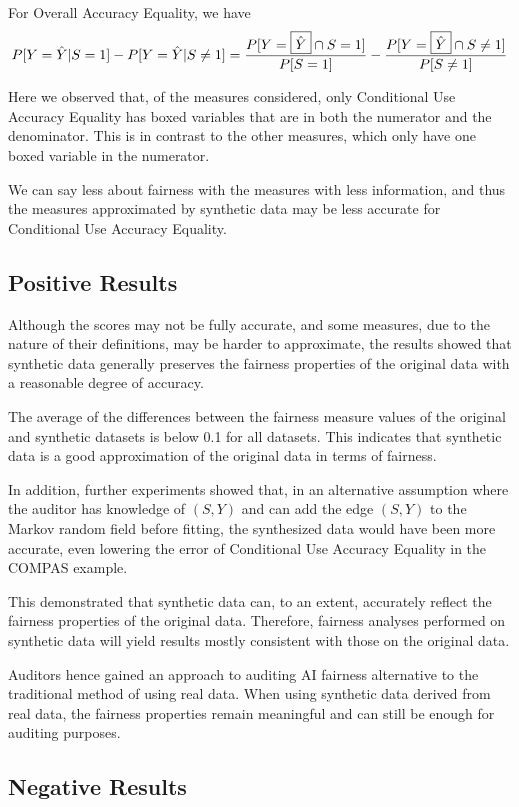 \documentclass[manuscript,screen,review,anonymous]{acmart}
\begin{document}
For Overall Accuracy Equality, we have
\[
P[Y = \hat{Y} | {S} = 1 ] - P[Y = \hat{Y} | {S} \neq 1]
= \frac{P[{Y} = \boxed{\hat{Y}} \cap {S} = 1]}{P[{S} = 1]} - \frac{P[{Y} = \boxed{\hat{Y}} \cap {{S}} \neq 1]}{P[{{S}} \neq 1]}
\]

Here we observed that, of the measures considered, only Conditional Use Accuracy Equality has boxed variables that are in both the numerator and the denominator. This is in contrast to the other measures, which only have one boxed variable in the numerator.

We can say less about fairness with the measures with less information, and thus the measures approximated by synthetic data may be less accurate for Conditional Use Accuracy Equality.

\subsection{Positive Results}

Although the scores may not be fully accurate, and some measures, due to the nature of their definitions, may be harder to approximate, the results showed that synthetic data generally preserves the fairness properties of the original data with a reasonable degree of accuracy.

The average of the differences between the fairness measure values of the original and synthetic datasets is below 0.1 for all datasets. This indicates that synthetic data is a good approximation of the original data in terms of fairness.

In addition, further experiments showed that, in an alternative assumption where the auditor has knowledge of $(S,Y)$ and can add the edge $(S,Y)$ to the Markov random field before fitting, the synthesized data would have been more accurate, even lowering the error of Conditional Use Accuracy Equality in the COMPAS example.

This demonstrated that synthetic data can, to an extent, accurately reflect the fairness properties of the original data. Therefore, fairness analyses performed on synthetic data will yield results mostly consistent with those on the original data.

Auditors hence gained an approach to auditing AI fairness alternative to the traditional method of using real data. When using synthetic data derived from real data, the fairness properties remain meaningful and can still be enough for auditing purposes.

\subsection{Negative Results}
\end{document}
